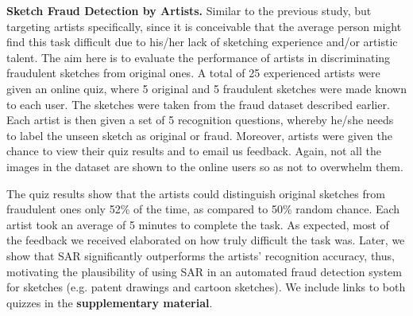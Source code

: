 

\noindent\textbf{Sketch Fraud Detection by Artists.} Similar to the previous study, but targeting artists specifically, since it is conceivable that the average person might find this task difficult due to his/her lack of sketching experience and/or artistic talent. The aim here is to evaluate the performance of artists in discriminating fraudulent sketches from original ones. A total of 25 experienced artists were given an online quiz, where 5 original and 5 fraudulent sketches were made known to each user. The sketches were taken from the fraud dataset described earlier. Each artist is then given a set of 5 recognition questions, whereby he/she needs to label the unseen sketch as original or fraud. Moreover, artists were given the chance to view their quiz results and to email us feedback. Again, not all the images in the dataset are shown to the online users so as not to overwhelm them.

The quiz results show that the artists could distinguish original sketches from fraudulent ones only 52\% of the time, as compared to 50\% random chance. Each artist took an average of 5 minutes to complete the task. As expected, most of the feedback we received elaborated on how truly difficult the task was. Later, we show that SAR significantly outperforms the artists' recognition accuracy, thus, motivating the plausibility of using SAR in an automated fraud detection system for sketches (e.g. patent drawings and cartoon sketches). We include links to both quizzes in the \textbf{supplementary material}.
